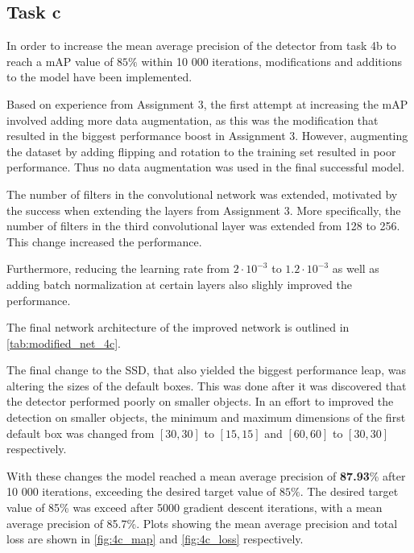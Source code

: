 \documentclass{article}
\begin{document}
\subsection{Task c}
In order to increase the mean average precision of the detector from task 4b to reach a mAP value of $85\%$ within 10 000 iterations, modifications and additions to the model have been implemented. 

Based on experience from Assignment 3, the first attempt at increasing the mAP involved adding more data augmentation, as this was the modification that resulted in the biggest performance boost in Assignment 3. However, augmenting the dataset by adding flipping and rotation to the training set resulted in poor performance. Thus no data augmentation was used in the final successful model. 

The number of filters in the convolutional network was extended, motivated by the success when extending the layers from Assignment 3. More specifically, the number of filters in the third convolutional layer was extended from 128 to 256. This change increased the performance.

Furthermore, reducing the learning rate from $2\cdot 10^{-3}$ to $1.2\cdot 10^{-3}$ as well as adding batch normalization at certain layers also slighly improved the performance.   


The final network architecture of the improved network is outlined in \autoref{tab:modified_net_4c}.

The final change to the SSD, that also yielded the biggest performance leap, was altering the sizes of the default boxes. This was done after it was discovered that the detector performed poorly on smaller objects. In an effort to improved the detection on smaller objects, the minimum and maximum dimensions of the first default box was changed from $[30,30]$ to $[15,15]$ and $[60,60]$ to $[30,30]$ respectively. 

With these changes the model reached a mean average precision of \textbf{87.93}\% after 10 000 iterations, exceeding the desired target value of $85\%$. The desired target value of 85\% was exceed after 5000 gradient descent iterations, with a mean average precision of 85.7\%. 
Plots showing the mean average precision and total loss are shown in \autoref{fig:4c_map} and \autoref{fig:4c_loss} respectively.
\end{document}
